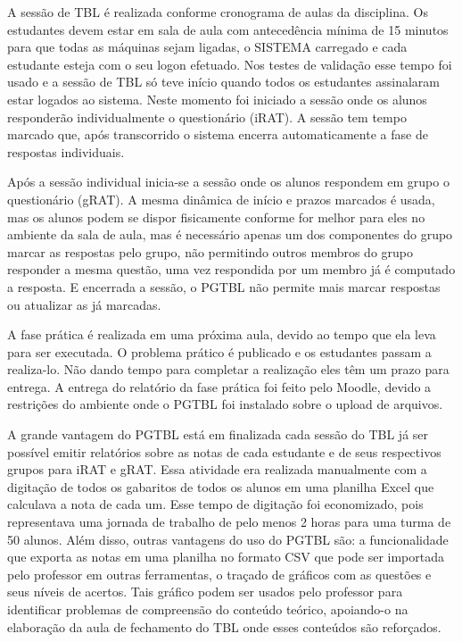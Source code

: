 \begin{quoting}[rightmargin=0cm, leftmargin=4cm]
  \noindent
  A sessão de TBL é realizada conforme cronograma de aulas da disciplina. Os estudantes devem estar em sala de aula com
  antecedência mínima de 15 minutos para que todas as máquinas sejam ligadas, o SISTEMA carregado e cada estudante
  esteja com o seu logon efetuado. Nos testes de validação esse tempo foi usado e a sessão de TBL só teve início quando
  todos os estudantes assinalaram estar logados ao sistema. Neste momento foi iniciado a sessão onde os alunos
  responderão individualmente o questionário (iRAT). A sessão tem tempo marcado que, após transcorrido o sistema encerra
  automaticamente a fase de respostas individuais.

  \noindent
  Após a sessão individual inicia-se a sessão onde os alunos respondem em grupo o questionário (gRAT).  A mesma
  dinâmica  de início e prazos marcados é usada, mas os alunos podem se dispor fisicamente conforme for melhor para eles
  no ambiente da sala de aula, mas é necessário apenas um dos componentes do grupo marcar as respostas pelo grupo, não
  permitindo outros membros do grupo responder a mesma questão, uma vez respondida por um membro já é computado a resposta.
  E encerrada a sessão, o PGTBL não permite mais marcar respostas ou atualizar as já marcadas.

  \noindent
  A fase prática é realizada em uma próxima aula, devido ao tempo que ela leva para ser executada. O problema prático é
  publicado e os estudantes passam a realiza-lo. Não dando tempo para completar a realização eles têm um prazo para
  entrega. A entrega do relatório da fase prática foi feito pelo Moodle, devido a restrições do ambiente onde o PGTBL
  foi instalado sobre o upload de arquivos.

  \noindent
  A grande vantagem do PGTBL está em finalizada cada sessão do TBL já ser possível emitir relatórios sobre as notas de
  cada estudante e de seus respectivos grupos para iRAT e gRAT. Essa atividade era realizada manualmente com a digitação
  de todos os gabaritos de todos os alunos em uma planilha Excel que calculava a nota de cada um. Esse tempo de
  digitação foi economizado, pois representava uma jornada de trabalho de pelo menos 2 horas para uma turma de 50
  alunos. Além disso, outras vantagens do uso do PGTBL são: a funcionalidade que exporta as notas em uma planilha no
  formato CSV que pode ser importada pelo professor em outras ferramentas, o traçado de gráficos com as questões e seus
  níveis de acertos. Tais gráfico podem ser usados pelo professor para identificar problemas de compreensão do conteúdo
  teórico, apoiando-o na elaboração da aula de fechamento do TBL onde esses conteúdos são reforçados.


\end{quoting}
